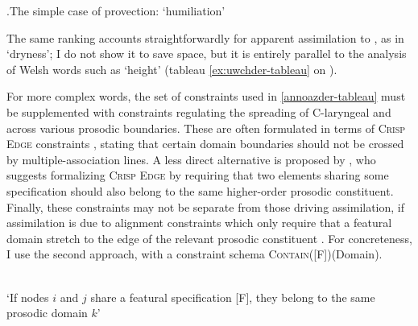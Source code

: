 \ex.\label{annoazder-tableau}The simple case of provection: \ipa{[ãnˈwɛstər]} `humiliation'\\

The same ranking accounts straightforwardly for apparent assimilation to , as in \ipa{[ˈzɛhtər]} `dryness'; I do not show it to save space, but it is entirely parallel to the analysis of Welsh words such as \ipa{[ˈiuχter]} `height' (tableau \ref{ex:uwchder-tableau} on ).

For more complex words, the set of constraints used in \cref{annoazder-tableau} must be supplemented with constraints regulating the spreading of C-laryngeal and  across various prosodic boundaries. These are often formulated in terms of \textsc{Crisp Edge} constraints \citep[\egm][]{noske97:_featur,ito99:_realig,italianstress}, stating that certain domain boundaries should not be crossed by multiple\hyp association lines. A less direct alternative is proposed by \citet{bickmore00:_downs_namwan}, who suggests formalizing \textsc{Crisp Edge} by requiring that two elements sharing some specification should also belong to the same higher\hyp order prosodic constituent. Finally, these constraints may not be separate from those driving assimilation, if assimilation is due to alignment constraints which only require that a featural domain stretch to the edge of the relevant prosodic constituent \citep[\egm][]{jurgec10:_featur_spread}. For concreteness, I use the second approach, with a constraint schema \textsc{Contain}([F])(Domain).

\begin{constraint}
  \label{def:contain}
  \\
  `If nodes $i$ and $j$ share a featural specification [F], they belong to the same prosodic domain $k$'
\end{constraint}


